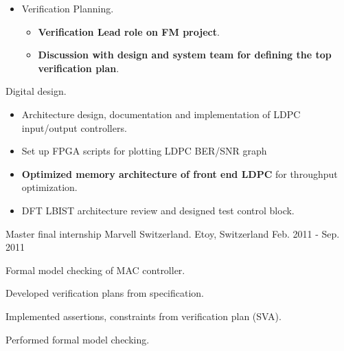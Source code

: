 \begin{cventries}
{\begin{cvitems}
\begin{itemize}
\begin{itemize}
            \item {Functional coverage: defined and implemented covergroups from verification plan}
          \end{itemize}
          \item {Verification Planning.}
          \begin{itemize}
            \item {\textbf{Verification Lead role on FM project}.}
            \item {\textbf{Discussion with design and system team for defining the top verification plan}.}
          \end{itemize}
        \end{itemize}
        \item {Digital design.}
        \begin{itemize}
          \item {Architecture design, documentation and implementation of LDPC input/output controllers.}
          \item {Set up FPGA scripts for plotting LDPC BER/SNR graph}
          \item {\textbf{Optimized memory architecture of front end LDPC} for throughput optimization.}
          \item {DFT LBIST architecture review and designed test control block.}
        \end{itemize}
      \end{cvitems}
    }


  \cventry
    {Master final internship} %
    {Marvell Switzerland.} %
    {Etoy, Switzerland} %
    {Feb. 2011 - Sep. 2011} %
    {
      \begin{cvitems} %
        \item {Formal model checking of MAC controller.}
        \item {Developed verification plans from specification.}
        \item {Implemented assertions, constraints from verification plan (SVA).}
        \item {Performed formal model checking.}
      \end{cvitems}
    }

\end{cventries}
